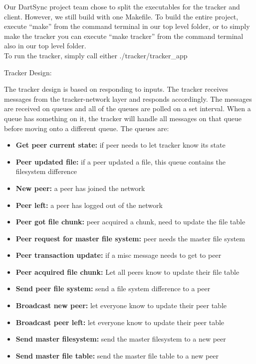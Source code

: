 

	Our DartSync project team chose to split the executables for the tracker and client.  However, we still build with one Makefile.  To build the entire project, execute ``make'' from the command terminal in our top level folder, or to simply make the tracker you can execute ``make tracker'' from the command terminal also in our top level folder.  \\

	To run the tracker, simply call either ./tracker/tracker_app
	
	Tracker Design:

The tracker design is based on responding to inputs. The tracker receives messages from the tracker-network layer and responds accordingly. The messages are received on queues and all of the queues are polled on a set interval. When a queue has something on it, the tracker will handle all messages on that queue before moving onto a different queue. The queues are:

\begin{itemize}
\item \textbf{Get peer current state:} if peer needs to let tracker know its state
\item \textbf{Peer updated file:} if a peer updated a file, this queue contains the filesystem difference
\item \textbf{New peer:} a peer has joined the network
\item \textbf{Peer left:} a peer has logged out of the network
\item \textbf{Peer got file chunk:} peer acquired a chunk, need to update the file table
\item \textbf{Peer request for master file system:} peer needs the master file system
\end{itemize}

\begin{itemize}
\item \textbf{Peer transaction update:} if a misc message needs to get to peer
\item \textbf{Peer acquired file chunk:} Let all peers know to update their file table
\item \textbf{Send peer file system:} send a file system difference to a peer
\item \textbf{Broadcast new peer:} let everyone know to update their peer table
\item \textbf{Broadcast peer left:} let everyone know to update their peer table
\item \textbf{Send master filesystem:} send the master filesystem to a new peer
\item \textbf{Send master file table:} send the master file table to a new peer
\end{itemize}

